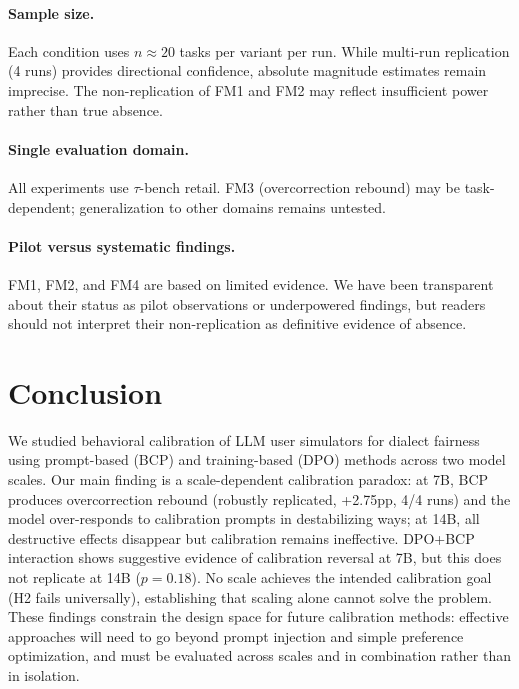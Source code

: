 \documentclass[11pt]{article}
\begin{document}
\paragraph{Sample size.}
Each condition uses $n \approx 20$ tasks per variant per run.
While multi-run replication (4 runs) provides directional confidence, absolute magnitude estimates remain imprecise.
The non-replication of FM1 and FM2 may reflect insufficient power rather than true absence.

\paragraph{Single evaluation domain.}
All experiments use $\tau$-bench retail.
FM3 (overcorrection rebound) may be task-dependent; generalization to other domains remains untested.

\paragraph{Pilot versus systematic findings.}
FM1, FM2, and FM4 are based on limited evidence.
We have been transparent about their status as pilot observations or underpowered findings, but readers should not interpret their non-replication as definitive evidence of absence.

\section{Conclusion}
\label{sec:conclusion}

We studied behavioral calibration of LLM user simulators for dialect fairness using prompt-based (BCP) and training-based (DPO) methods across two model scales.
Our main finding is a scale-dependent calibration paradox: at 7B, BCP produces overcorrection rebound (robustly replicated, +2.75pp, 4/4 runs) and the model over-responds to calibration prompts in destabilizing ways; at 14B, all destructive effects disappear but calibration remains ineffective.
DPO+BCP interaction shows suggestive evidence of calibration reversal at 7B, but this does not replicate at 14B ($p=0.18$).
No scale achieves the intended calibration goal (H2 fails universally), establishing that scaling alone cannot solve the problem.
These findings constrain the design space for future calibration methods: effective approaches will need to go beyond prompt injection and simple preference optimization, and must be evaluated across scales and in combination rather than in isolation.
\end{document}
